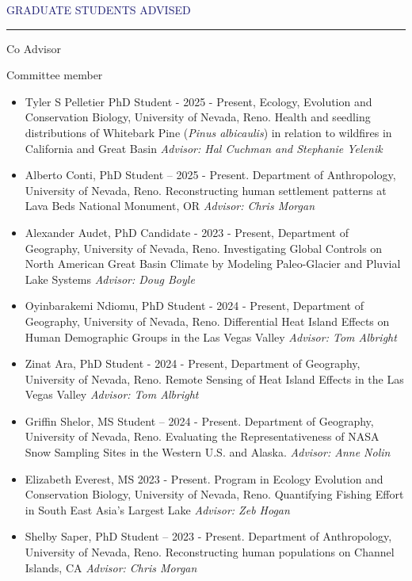 \documentclass{resume} %
\renewenvironment{rSection}[1]{
\sectionskip
\textcolor{MidnightBlue}{\MakeUppercase{#1}}
\sectionlineskip
\hrule
\begin{list}{}{
\setlength{\leftmargin}{1.5em}
}
\item[]
}{
\end{list}
}
\begin{document}
\begin{rSection}{Graduate Students Advised}
\begin{rSubsection}{Co Advisor}{}{}{}
\begin{itemize}
\end{itemize}
\end{rSubsection}
\begin{rSubsection}{Committee member}{}{}{}
\begin{itemize}
\item[] Tyler S Pelletier PhD Student - 2025 - Present, Ecology, Evolution and Conservation Biology, University of Nevada, Reno. Health and seedling distributions of Whitebark Pine (\textit{Pinus albicaulis}) in relation to wildfires in California and Great Basin \textit{Advisor: Hal Cuchman and Stephanie Yelenik}

\item[] Alberto Conti, PhD Student – 2025 - Present. Department of Anthropology, University of Nevada, Reno. Reconstructing human settlement patterns at Lava Beds National Monument, OR \textit{Advisor: Chris Morgan}

\item[] Alexander Audet, PhD Candidate - 2023 - Present, Department of Geography, University of Nevada, Reno. Investigating Global Controls on North American Great Basin Climate by Modeling Paleo-Glacier and Pluvial Lake Systems
 \textit{Advisor: Doug Boyle}

\item[] Oyinbarakemi Ndiomu, PhD Student - 2024 - Present, Department of Geography, University of Nevada, Reno. Differential Heat Island Effects on Human Demographic Groups in the Las Vegas Valley \textit{Advisor: Tom Albright}

\item[] Zinat Ara, PhD Student - 2024 - Present, Department of Geography, University of Nevada, Reno. Remote Sensing of Heat Island Effects in the Las Vegas Valley \textit{Advisor: Tom Albright}

\item[] Griffin Shelor, MS Student – 2024 - Present. Department of Geography, University of Nevada, Reno. Evaluating the Representativeness of NASA Snow Sampling Sites in the Western U.S. and Alaska. \textit{Advisor: Anne Nolin}

\item[] Elizabeth Everest, MS 2023 - Present. Program in Ecology Evolution and Conservation Biology, University of Nevada, Reno. Quantifying Fishing Effort in South East Asia's Largest Lake
 \textit{Advisor: Zeb Hogan}

\item[] Shelby Saper, PhD Student – 2023 - Present. Department of Anthropology, University of Nevada, Reno. Reconstructing human populations on Channel Islands, CA \textit{Advisor: Chris Morgan}


\end{itemize}
\end{rSubsection}
\end{rSection}
\end{document}
